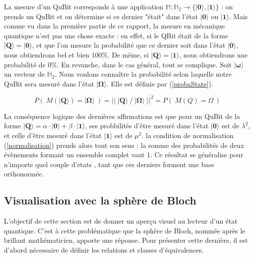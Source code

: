 \documentclass[a4paper,12pt]{report}
\newcommand{\prodSc}[2]{\langle #1 / #2 \rangle}
\newcommand{\quSt}[1]{\bm{|#1\rangle}}
\begin{document}
\par{
	La mesure d'un QuBit corresponds à une application $\mathbb{M} : \mathbb{H}_{2} \rightarrow \{ \quSt{0}, \quSt{1} \}$ : on prends un QuBit et on détermine si ce dernier "était" dans l'état $\quSt{0}$ ou $\quSt{1}$. Mais comme vu dans la première partie de ce rapport, la mesure en mécanique quantique n'est pas une chose exacte : en effet, si le QBit était de la forme $\quSt{Q} = \quSt{0}$, et que l'on mesure la probabilité que ce dernier soit dans l'état $\quSt{0}$, nous obtiendrons bel et bien 100\%. De même, si $\quSt{Q} = \quSt{1}$, nous obtiendrons une probabilité de 0\%. En revanche, dans le cas général, tout se complique. Soit $\quSt{\omega}$ un vecteur de $\mathbb{H}_{2}$. Nous voulons connaître la probabilité selon laquelle notre QuBit sera mesuré dans l'état $\quSt{\Omega}$. Elle est définie par (\ref{probaState}).
}

\begin{equation} \label{probaState}
	P(~ M( \quSt{Q} ) = \quSt{\Omega} ~) = | \langle ~ \quSt{Q} ~/~  \quSt{\Omega} ~\rangle |^2 = P(~ M( Q ) = \Omega ~)
\end{equation}

\vspace{1\baselineskip}

\par{
	La conséquence logique des dernières affirmations est que pour un QuBit de la forme $\quSt{Q} = \alpha \cdot \quSt{0} + \beta \cdot \quSt{1}$, ses probbilités d'être mesuré dans l'état $\quSt{0}$ est de $\lambda^2$, et celle d'être mesuré dans l'état $\quSt{1}$ est de $\mu^2$. la condition de normalisation (\ref{normalisation}) prends alors tout son sens : la somme des probabilités de deux évènements formant un ensemble complet vaut 1. Ce résultat se généralise pour n'importe quel couple d'etats , tant que ces derniers forment une base orthonormée.
}

		\subsection{Visualisation avec la sphère de Bloch}

\par{
	L'objectif de cette section est de donner un aperçu visuel au lecteur d'un état quantique. C'est à cette problématique que la sphère de Bloch, nommée après le brillant mathématicien, apporte une réponse. Pour présenter cette dernière, il est d'abord nécessaire de définir les relations et classes d'équivalences. \\
}
\end{document}
